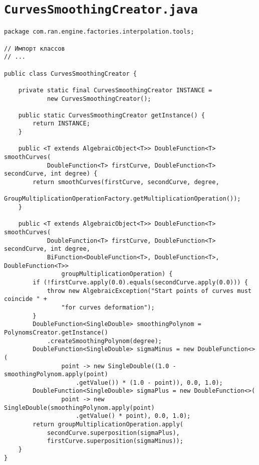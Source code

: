 \section*{\texttt{CurvesSmoothingCreator.java}}
\begin{verbatim}
package com.ran.engine.factories.interpolation.tools;

// Импорт классов
// ...

public class CurvesSmoothingCreator {

    private static final CurvesSmoothingCreator INSTANCE =
            new CurvesSmoothingCreator();

    public static CurvesSmoothingCreator getInstance() {
        return INSTANCE;
    }

    public <T extends AlgebraicObject<T>> DoubleFunction<T> smoothCurves(
            DoubleFunction<T> firstCurve, DoubleFunction<T> secondCurve, int degree) {
        return smoothCurves(firstCurve, secondCurve, degree,
                GroupMultiplicationOperationFactory.getMultiplicationOperation());
    }

    public <T extends AlgebraicObject<T>> DoubleFunction<T> smoothCurves(
            DoubleFunction<T> firstCurve, DoubleFunction<T> secondCurve, int degree,
            BiFunction<DoubleFunction<T>, DoubleFunction<T>, DoubleFunction<T>>
                groupMultiplicationOperation) {
        if (!firstCurve.apply(0.0).equals(secondCurve.apply(0.0))) {
            throw new AlgebraicException("Start points of curves must coincide " +
                "for curves deformation");
        }
        DoubleFunction<SingleDouble> smoothingPolynom = PolynomsCreator.getInstance()
            .createSmoothingPolynom(degree);
        DoubleFunction<SingleDouble> sigmaMinus = new DoubleFunction<>(
                point -> new SingleDouble((1.0 - smoothingPolynom.apply(point)
                    .getValue()) * (1.0 - point)), 0.0, 1.0);
        DoubleFunction<SingleDouble> sigmaPlus = new DoubleFunction<>(
                point -> new SingleDouble(smoothingPolynom.apply(point)
                    .getValue() * point), 0.0, 1.0);
        return groupMultiplicationOperation.apply(
            secondCurve.superposition(sigmaPlus),
            firstCurve.superposition(sigmaMinus));
    }
}
\end{verbatim}

